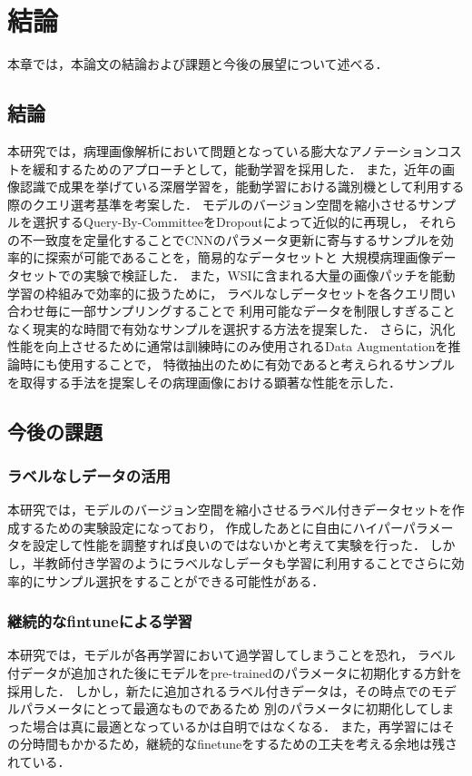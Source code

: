\chapter{結論}
本章では，本論文の結論および課題と今後の展望について述べる．

\section{結論}
本研究では，病理画像解析において問題となっている膨大なアノテーションコストを緩和するためのアプローチとして，能動学習を採用した．
また，近年の画像認識で成果を挙げている深層学習を，能動学習における識別機として利用する際のクエリ選考基準を考案した．
モデルのバージョン空間を縮小させるサンプルを選択するQuery-By-CommitteeをDropoutによって近似的に再現し，
それらの不一致度を定量化することでCNNのパラメータ更新に寄与するサンプルを効率的に探索が可能であることを，簡易的なデータセットと
大規模病理画像データセットでの実験で検証した．
また，WSIに含まれる大量の画像パッチを能動学習の枠組みで効率的に扱うために，
ラベルなしデータセットを各クエリ問い合わせ毎に一部サンプリングすることで
利用可能なデータを制限しすぎることなく現実的な時間で有効なサンプルを選択する方法を提案した．
さらに，汎化性能を向上させるために通常は訓練時にのみ使用されるData Augmentationを推論時にも使用することで，
特徴抽出のために有効であると考えられるサンプルを取得する手法を提案しその病理画像における顕著な性能を示した．


\section{今後の課題}

\subsection{ラベルなしデータの活用}
本研究では，モデルのバージョン空間を縮小させるラベル付きデータセットを作成するための実験設定になっており，
作成したあとに自由にハイパーパラメータを設定して性能を調整すれば良いのではないかと考えて実験を行った．
しかし，半教師付き学習のようにラベルなしデータも学習に利用することでさらに効率的にサンプル選択をすることができる可能性がある．

\subsection{継続的なfintuneによる学習}
本研究では，モデルが各再学習において過学習してしまうことを恐れ，
ラベル付データが追加された後にモデルをpre-trainedのパラメータに初期化する方針を採用した．
しかし，新たに追加されるラベル付きデータは，その時点でのモデルパラメータにとって最適なものであるため
別のパラメータに初期化してしまった場合は真に最適となっているかは自明ではなくなる．
また，再学習にはその分時間もかかるため，継続的なfinetuneをするための工夫を考える余地は残されている．

